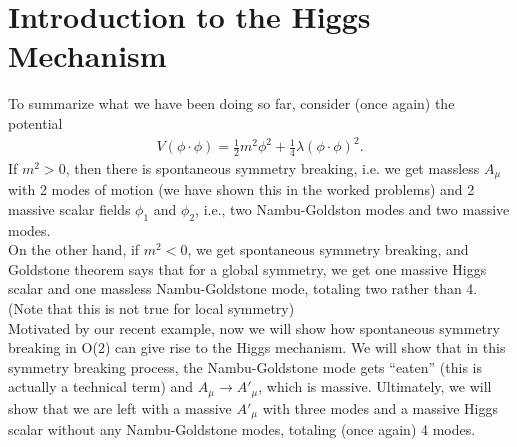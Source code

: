 \documentclass{book}
\numberwithin{equation}{section}
\theoremstyle{definition}
\begin{document}
\section{Introduction to the Higgs Mechanism}
To summarize what we have been doing so far, consider (once again) the potential
\begin{align}
V(\phi\cdot\phi) = \frac{1}{2}m^2\phi^2 + \frac{1}{4}\lambda(\phi\cdot\phi)^2.
\end{align}
If $m^2 > 0$, then there is spontaneous symmetry breaking, i.e. we get massless $A_\mu$ with 2 modes of motion (we have shown this in the worked problems) and 2 massive scalar fields $\phi_1$ and $\phi_2$, i.e., two Nambu-Goldston modes and two massive modes.\\

On the other hand, if $m^2 < 0$, we get spontaneous symmetry breaking, and Goldstone theorem says that for a global symmetry, we get one massive Higgs scalar and one massless Nambu-Goldstone mode, totaling two rather than 4. (Note that this is not true for local symmetry)\\

Motivated by our recent example, now we will show how spontaneous symmetry breaking in O(2) can give rise to the Higgs mechanism. We will show that in this symmetry breaking process, the Nambu-Goldstone mode gets ``eaten'' (this is actually a technical term) and $A_\mu \to A'_\mu$, which is massive. Ultimately, we will show that we are left with a massive $A'_\mu$ with three modes and a massive Higgs scalar without any Nambu-Goldstone modes, totaling (once again) 4 modes.  \\
\end{document}
